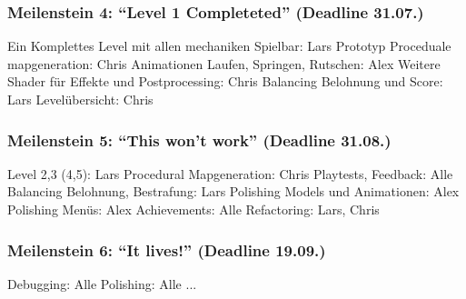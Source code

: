 \documentclass{article}
\begin{document}
\subsubsection{Meilenstein 4: “Level 1 Completeted” (Deadline 31.07.)}
Ein Komplettes Level mit allen mechaniken Spielbar: Lars\newline
Prototyp Proceduale mapgeneration: Chris\newline
Animationen Laufen, Springen, Rutschen: Alex\newline
Weitere Shader für Effekte und Postprocessing: Chris\newline
Balancing Belohnung und Score: Lars\newline
Levelübersicht: Chris\newline
\subsubsection{Meilenstein 5: “This won’t work” (Deadline 31.08.)}
Level 2,3 (4,5): Lars\newline
Procedural Mapgeneration: Chris\newline
Playtests, Feedback: Alle\newline
Balancing Belohnung, Bestrafung: Lars\newline
Polishing Models und Animationen: Alex\newline
Polishing Menüs: Alex\newline
Achievements: Alle\newline
Refactoring: Lars, Chris\newline
\subsubsection{Meilenstein 6: “It lives!” (Deadline 19.09.)}
Debugging: Alle\newline
Polishing: Alle\newline
...\newline

	
\end{document}

